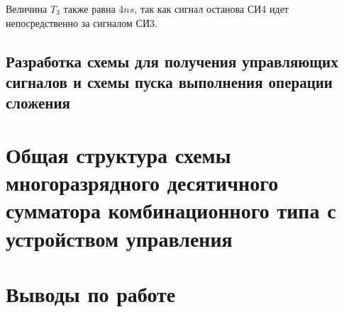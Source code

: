 \documentclass[a4paper,14pt]{article}
\begin{document}
Величина $T_3$ также равна $4ns$, так как сигнал останова СИ4 идет непосредственно за сигналом СИ3.

\subsection{Разработка схемы для получения управляющих сигналов и схемы пуска выполнения операции сложения}

\section{Общая структура схемы многоразрядного десятичного сумматора комбинационного типа с устройством управления}

\section{Выводы по работе}
\end{document}
